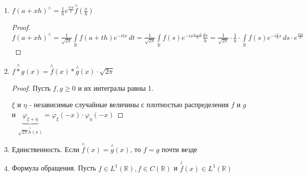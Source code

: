 \begin{properties}
\begin{enumerate}
{            Тогда $\overset{\wedge}{f}^{(k)} (x) = (ix)^k \overset{\wedge}{f} (x)$

            \begin{proof}
                Надо доказать, что $\overset{\wedge}{f'} (x) = ix \cdot \overset{\wedge}{f} (x)$

                $\overset{\wedge}{f'} (x) = \frac{1}{\sqrt{2\pi}} \int\limits_{\mathbb{R}} f'(t) e^{-itx} \, dt = \frac{1}{\sqrt{2\pi}} f(t) e^{-itx} \bigg |_{t = -\infty}^{t = +\infty} + ix \cdot \underbrace{\frac{1}{\sqrt{2\pi}} \int\limits_{\mathbb{R}} f(t) e^{-itx} \, dt}_{=\overset{\wedge}{f} (x)}$

                $f(t) = \int\limits_0^t f' (s) \, ds \rightarrow_{t \to +\infty} \int\limits_0^\infty f' (s) \, ds \implies \lim\limits_{t \to \pm \infty} f(t)$ существует

                Если $a = \lim\limits_{t \to + \infty} f(t) \neq 0 \implies |f(t)| > \frac{|a|}{2}$ при больших $t$, а тогда нет суммируемости. Значит пределы нули и неинтегрального слагаемого у нас нет
            \end{proof}
        }
        \item {
            $f(a + xh)^{\wedge} = \frac{1}{h} e^{\frac{ixa}{h}} \overset{\wedge}{f} (\frac{x}{h})$

            \begin{proof}
                $f(a + xh)^{\wedge} = \frac{1}{\sqrt{2\pi}} \int\limits_{\mathbb{R}} f(a + th) e^{-itx} \, dt = \frac{1}{\sqrt{2\pi}} \int\limits_{\mathbb{R}} f(s) e^{-ix \frac{s - a}{h}} \frac{ds}{h} = \frac{1}{\sqrt{2\pi}} \cdot \frac{1}{h} \cdot \int\limits_{\mathbb{R}} f(s) e^{-i \frac{x}{h} s} \, ds \cdot e^{\frac{ixa}{h}}$
            \end{proof}
        }
        \item {
            $\overset{\wedge}{f * g} (x) = \overset{\wedge}{f} (x) * \overset{\wedge}{g} (x) \cdot \sqrt{2\pi}$

            \begin{proof}
                Пусть $f, g \geqslant 0$ и их интегралы равны 1.

                $\xi$ и $\eta$ - независимые случайные величины с плотностью распределения $f$ и $g$ и $\underbrace{\varphi_{\xi + \eta}}_{\sqrt{2\pi} \overset{\wedge}{h} (x)} = \varphi_{\xi} (-x) \cdot \varphi_{\eta} (-x)$
            \end{proof}
        }
        \item {
            Единственность. Если $\overset{\wedge}{f} (x) = \overset{\wedge}{g} (x)$, то $f = g$ почти везде
        }
        \item {
            Формула обращения. Пусть $f \in L^1 (\mathbb{R}), f \in C(\mathbb{R})$ и $\overset{\wedge}{f} (x) \in L^1 (\mathbb{R})$

}
\end{enumerate}
\end{properties}
